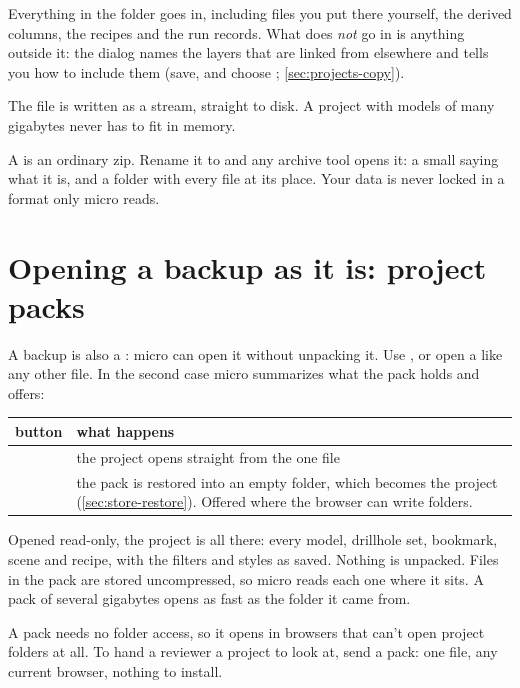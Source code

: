 Everything in the folder goes in, including files you put there yourself, the derived columns, the recipes and the run records. What does \emph{not} go in is anything outside it: the dialog names the layers that are linked from elsewhere and tells you how to include them (save, and choose ; \cref{sec:projects-copy}).

The file is written as a stream, straight to disk. A project with models of many gigabytes never has to fit in memory.

\begin{note}
A  is an ordinary zip. Rename it to  and any archive tool opens it: a small  saying what it is, and a  folder with every file at its place. Your data is never locked in a format only micro reads.
\end{note}

\section{Opening a backup as it is: project packs}\label{sec:store-packs}
A backup is also a : micro can open it without unpacking it. Use , or open a  like any other file. In the second case micro summarizes what the pack holds and offers:

\begin{tabularx}{\linewidth}{@{}lL@{}}\toprule
button & what happens \\ \midrule
{} & the project opens straight from the one file \\
 & the pack is restored into an empty folder, which becomes the project (\cref{sec:store-restore}). Offered where the browser can write folders. \\
\bottomrule
\end{tabularx}

Opened read-only, the project is all there: every model, drillhole set, bookmark, scene and recipe, with the filters and styles as saved. Nothing is unpacked. Files in the pack are stored uncompressed, so micro reads each one where it sits. A pack of several gigabytes opens as fast as the folder it came from.

A pack needs no folder access, so it opens in browsers that can't open project folders at all. To hand a reviewer a project to look at, send a pack: one file, any current browser, nothing to install.

